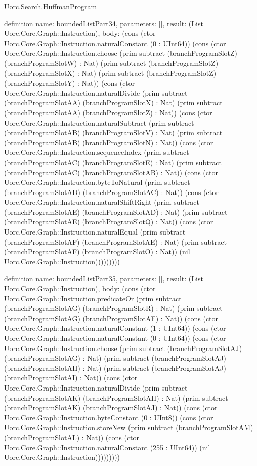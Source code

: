 \begin{lexlean}{Uorc.Search.HuffmanProgram}
\begin{semanticmodule}
definition{
  name: boundedListPart34,
  parameters: [],
  result: (List Uorc.Core.Graph::Instruction),
  body: (cons (ctor Uorc.Core.Graph::Instruction.naturalConstant (0 : UInt64)) (cons (ctor Uorc.Core.Graph::Instruction.choose (prim subtract (branchProgramSlotZ) (branchProgramSlotW) : Nat) (prim subtract (branchProgramSlotZ) (branchProgramSlotX) : Nat) (prim subtract (branchProgramSlotZ) (branchProgramSlotY) : Nat)) (cons (ctor Uorc.Core.Graph::Instruction.naturalDivide (prim subtract (branchProgramSlotAA) (branchProgramSlotX) : Nat) (prim subtract (branchProgramSlotAA) (branchProgramSlotZ) : Nat)) (cons (ctor Uorc.Core.Graph::Instruction.naturalSubtract (prim subtract (branchProgramSlotAB) (branchProgramSlotV) : Nat) (prim subtract (branchProgramSlotAB) (branchProgramSlotN) : Nat)) (cons (ctor Uorc.Core.Graph::Instruction.sequenceIndex (prim subtract (branchProgramSlotAC) (branchProgramSlotE) : Nat) (prim subtract (branchProgramSlotAC) (branchProgramSlotAB) : Nat)) (cons (ctor Uorc.Core.Graph::Instruction.byteToNatural (prim subtract (branchProgramSlotAD) (branchProgramSlotAC) : Nat)) (cons (ctor Uorc.Core.Graph::Instruction.naturalShiftRight (prim subtract (branchProgramSlotAE) (branchProgramSlotAD) : Nat) (prim subtract (branchProgramSlotAE) (branchProgramSlotQ) : Nat)) (cons (ctor Uorc.Core.Graph::Instruction.naturalEqual (prim subtract (branchProgramSlotAF) (branchProgramSlotAE) : Nat) (prim subtract (branchProgramSlotAF) (branchProgramSlotO) : Nat)) (nil Uorc.Core.Graph::Instruction)))))))))
}

definition{
  name: boundedListPart35,
  parameters: [],
  result: (List Uorc.Core.Graph::Instruction),
  body: (cons (ctor Uorc.Core.Graph::Instruction.predicateOr (prim subtract (branchProgramSlotAG) (branchProgramSlotR) : Nat) (prim subtract (branchProgramSlotAG) (branchProgramSlotAF) : Nat)) (cons (ctor Uorc.Core.Graph::Instruction.naturalConstant (1 : UInt64)) (cons (ctor Uorc.Core.Graph::Instruction.naturalConstant (0 : UInt64)) (cons (ctor Uorc.Core.Graph::Instruction.choose (prim subtract (branchProgramSlotAJ) (branchProgramSlotAG) : Nat) (prim subtract (branchProgramSlotAJ) (branchProgramSlotAH) : Nat) (prim subtract (branchProgramSlotAJ) (branchProgramSlotAI) : Nat)) (cons (ctor Uorc.Core.Graph::Instruction.naturalDivide (prim subtract (branchProgramSlotAK) (branchProgramSlotAH) : Nat) (prim subtract (branchProgramSlotAK) (branchProgramSlotAJ) : Nat)) (cons (ctor Uorc.Core.Graph::Instruction.byteConstant (0 : UInt8)) (cons (ctor Uorc.Core.Graph::Instruction.storeNew (prim subtract (branchProgramSlotAM) (branchProgramSlotAL) : Nat)) (cons (ctor Uorc.Core.Graph::Instruction.naturalConstant (255 : UInt64)) (nil Uorc.Core.Graph::Instruction)))))))))
}


\end{semanticmodule}
\end{lexlean}
